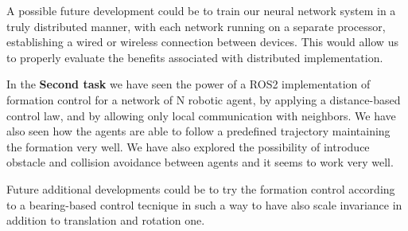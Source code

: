 \documentclass[a4paper,11pt,oneside]{book}
\begin{document}
A possible future development could be to train our neural network system in a truly distributed manner, with each network running on a separate processor, establishing a wired or wireless connection between devices. This would allow us to properly evaluate the benefits associated with distributed implementation.

\bigskip
In the \textbf{Second task} we have seen the power of a ROS2 implementation of formation control for a network of N robotic agent, by applying a distance-based control law, and by allowing only local communication with neighbors. We have also seen how the agents are able to follow a predefined trajectory maintaining the formation very well.
We have also explored the possibility of introduce obstacle and collision avoidance between agents and it seems to work very well. 

Future additional developments could be to try the formation control according to a bearing-based control tecnique in such a way to have also scale invariance in addition to translation and rotation one.


%


\end{document}
